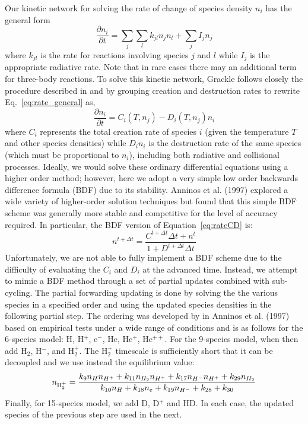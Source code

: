 Our kinetic network for solving the rate of change of species density $n_i$ has the general form
\begin{equation}
\frac{\partial n_i}{\partial t} = \sum_j \sum_l k_{jl} n_j n_l + \sum_j I_j n_j
\label{eq:rate_general}
\end{equation}
where $k_{jl}$ is the rate for reactions involving species $j$ and $l$ while $I_j$ is the appropriate radiative rate.  Note that in rare cases there may an additional term for three-body reactions.   To solve this kinetic network, Grackle follows closely the procedure described in \citet{1997NewA....2..209A} and \citet{2014ApJS..211...19B} by grouping creation and destruction rates to rewrite Eq.~\ref{eq:rate_general} as,
\begin{equation}
\frac{\partial n_i}{\partial t} = C_i(T, n_j) - D_i(T, n_j) n_i
\label{eq:rateCD}
\end{equation}
where $C_i$ represents the total creation rate of species $i$ (given the temperature $T$ and other species densities) while $D_i n_i$ is the destruction rate of the same species (which must be proportional to $n_i$), including both radiative and collisional processes.  Ideally, we would solve these ordinary differential equations using a higher order method; however, here we adopt a very simple low order backwards difference formula (BDF) due to its stability.  Anninos et al. (1997) explored a wide variety of higher-order solution techniques but found that this simple BDF scheme was generally more stable and competitive for the level of accuracy required.  In particular, the BDF version of Equation~\ref{eq:rateCD} is:
\begin{equation}
n^{t + \Delta t} = \frac{C^{t+\Delta t} \Delta t + n^t}{1 + D^{t+\Delta t} \Delta t}
\label{eq:rate_BDF}
\end{equation}
Unfortunately, we are not able to fully implement a BDF scheme due to the difficulty of evaluating the $C_i$ and $D_i$ at the advanced time.  Instead, we attempt to mimic a BDF method through a set of partial updates combined with sub-cycling.  The partial forwarding updating is done by solving the the various species in a specified order and using the updated species densities in the following partial step.  The ordering was developed by in Anninos et al. (1997) based on empirical tests under a wide range of conditions and is as follows for the 6-species model: H, H$^+$, e$^-$, He, He$^+$, He$^{++}$.  For the 9-species model, when then add H$_2$, H$^-$, and H$_2^+$.  The H$_2^+$ timescale is sufficiently short that it can be decoupled and we use instead the equilibrium value:
\begin{equation}
n_{ {\rm H}_2^+} = \frac{k_9 n_H n_{H^+} + k_{11} n_{H_2} n_{H^+} + k_{17} n_{H^-} n_{H^+} + k_{29} n_{H_2}}
   {k_{10} n_H + k_{18} n_e + k_{19} n_{H^-} + k_{28} + k_{30}}
\end{equation}
Finally, for 15-species model, we add D, D$^+$ and HD.  In each case, the updated species of the previous step are used in the next.  

